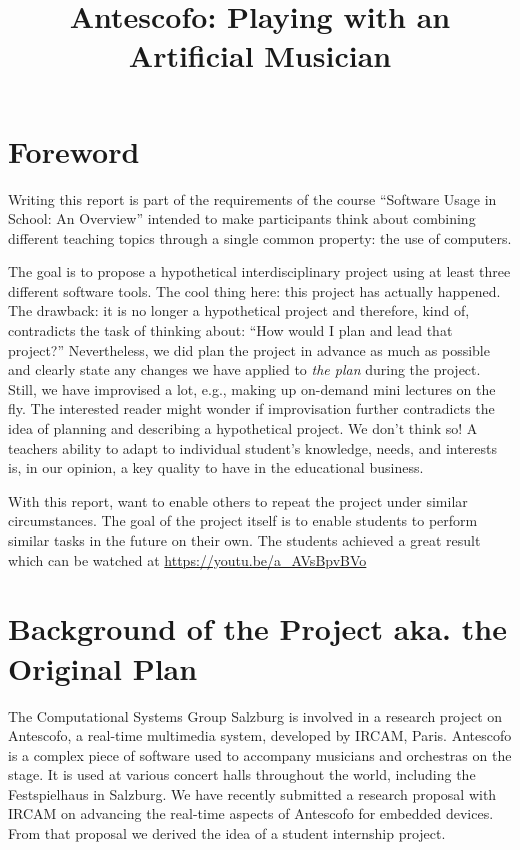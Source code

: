 \documentclass[onecolumn,nocopyrightspace,preprint]{sigplanconf}
\title{Antescofo: Playing with an Artificial Musician}
\begin{document}
\maketitle




\section{Foreword}  

Writing this report is part of the requirements of the course ``Software Usage
in School: An Overview'' intended to make participants think about combining
different teaching topics through a single common property: the use of
computers.

The goal is to propose a hypothetical interdisciplinary project using at least
three different software tools. The cool thing here: this project has actually
happened. The drawback: it is no longer a hypothetical project and therefore,
kind of, contradicts the task of thinking about: ``How would I plan and lead
that project?'' Nevertheless, we did plan the project in advance as much as
possible and clearly state any changes we have applied  to \textit{the plan}
during the project. Still, we have improvised a lot, e.g., making up on-demand
mini lectures on the fly. The interested reader might wonder if improvisation
further contradicts the idea of planning and describing a hypothetical
project.  We don't think so! A teachers ability to adapt to individual
student's knowledge, needs, and interests is, in our opinion, a key quality to
have in the educational business.

With this report, want to enable others to repeat the project under similar
circumstances. The goal of the project itself is to enable students to perform
similar tasks in the future on their own.  The students achieved a great
result which can be watched at \url{https://youtu.be/a_AVsBpvBVo}


\section{Background of the Project aka. the Original Plan}\label{sec:background}

The Computational Systems Group Salzburg is involved in a research project on
Antescofo, a real-time multimedia system, developed by IRCAM, Paris. Antescofo
is a complex piece of software used to accompany musicians and orchestras on
the stage. It is used at various concert halls throughout the world, including
the Festspielhaus in Salzburg. We have recently submitted a research proposal
with IRCAM on advancing the real-time aspects of Antescofo for embedded
devices. From that proposal we derived the idea of a student internship
project.
\end{document}
